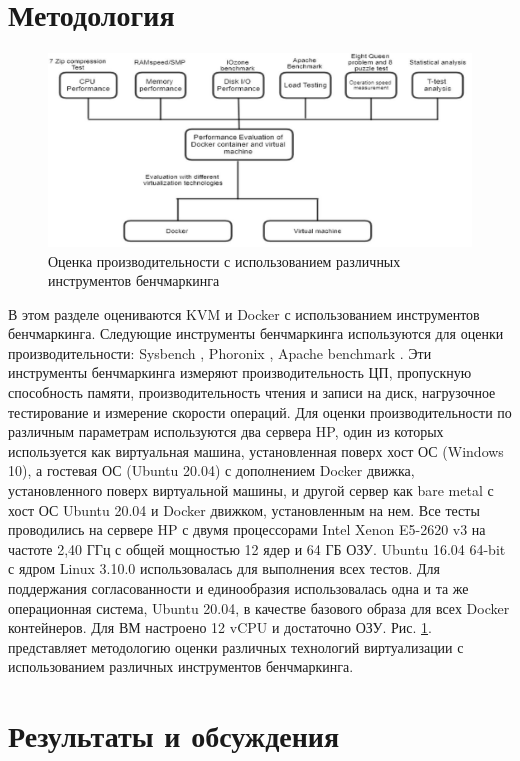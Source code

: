 \documentclass{mirea}
\begin{document}
	\section{Методология}
	
	\begin{figure}[H]
		\centering
		\includegraphics[width=.7\textwidth]{img3}
		\parskip=6pt
		\caption{Оценка производительности с использованием различных инструментов бенчмаркинга}
		\label{fig:pic3}
	\end{figure}
	
	
	В этом разделе оцениваются KVM и Docker с использованием инструментов бенчмаркинга. Следующие инструменты бенчмаркинга используются для оценки производительности: Sysbench \cite{cit11}, Phoronix \cite{cit12}, Apache benchmark \cite{cit13}. Эти инструменты бенчмаркинга измеряют производительность ЦП, пропускную способность памяти, производительность чтения и записи на диск, нагрузочное тестирование и измерение скорости операций. Для оценки производительности по различным параметрам используются два сервера HP, один из которых используется как виртуальная машина, установленная поверх хост ОС (Windows 10), а гостевая ОС (Ubuntu 20.04) с дополнением Docker движка, установленного поверх виртуальной машины, и другой сервер как bare metal с хост ОС Ubuntu 20.04 и Docker движком, установленным на нем. Все тесты проводились на сервере HP с двумя процессорами Intel Xenon E5-2620 v3 на частоте 2,40 ГГц с общей мощностью 12 ядер и 64 ГБ ОЗУ. Ubuntu 16.04 64-bit с ядром Linux 3.10.0 использовалась для выполнения всех тестов. Для поддержания согласованности и единообразия использовалась одна и та же операционная система, Ubuntu 20.04, в качестве базового образа для всех Docker контейнеров. Для ВМ настроено 12 vCPU и достаточно ОЗУ. Рис. \ref{fig:pic3}. представляет методологию оценки различных технологий виртуализации с использованием различных инструментов бенчмаркинга.
	
	\section{Результаты и обсуждения}
	
\end{document}
